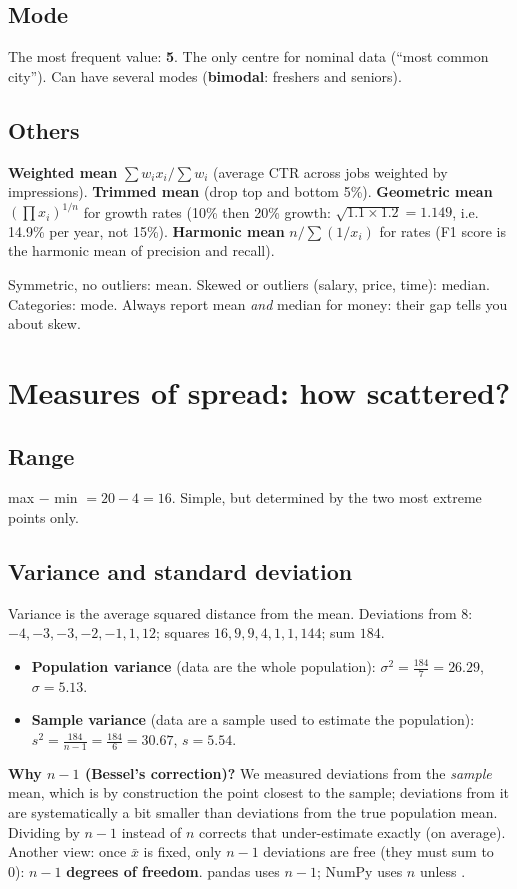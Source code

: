 \subsection{Mode}
The most frequent value: \textbf{5}. The only centre for nominal data (``most common city''). Can have several modes (\textbf{bimodal}: freshers and seniors).

\subsection{Others}
\textbf{Weighted mean} $\sum w_ix_i/\sum w_i$ (average CTR across jobs weighted by impressions). \textbf{Trimmed mean} (drop top and bottom 5\%).
\textbf{Geometric mean} $(\prod x_i)^{1/n}$ for growth rates (10\% then 20\% growth: $\sqrt{1.1\times1.2} = 1.149$, i.e. 14.9\% per year, not 15\%).
\textbf{Harmonic mean} $n/\sum(1/x_i)$ for rates (F1 score is the harmonic mean of precision and recall).

\begin{recap}
Symmetric, no outliers: mean. Skewed or outliers (salary, price, time): median. Categories: mode. Always report mean \emph{and} median for money: their gap
tells you about skew.
\end{recap}

\section{Measures of spread: how scattered?}
\subsection{Range}
max $-$ min $= 20 - 4 = 16$. Simple, but determined by the two most extreme points only.

\subsection{Variance and standard deviation}
Variance is the average squared distance from the mean. Deviations from 8: $-4, -3, -3, -2, -1, 1, 12$; squares $16, 9, 9, 4, 1, 1, 144$; sum $184$.
\begin{itemize}
\item \textbf{Population variance} (data are the whole population): $\sigma^2 = \frac{184}{7} = 26.29$, $\sigma = 5.13$.
\item \textbf{Sample variance} (data are a sample used to estimate the population): $s^2 = \frac{184}{n-1} = \frac{184}{6} = 30.67$, $s = 5.54$.
\end{itemize}
\textbf{Why $n-1$ (Bessel's correction)?} We measured deviations from the \emph{sample} mean, which is by construction the point closest to the sample;
deviations from it are systematically a bit smaller than deviations from the true population mean. Dividing by $n-1$ instead of $n$ corrects that
under-estimate exactly (on average). Another view: once $\bar x$ is fixed, only $n-1$ deviations are free (they must sum to 0): $n-1$
\textbf{degrees of freedom}. pandas  uses $n-1$; NumPy  uses $n$ unless .

